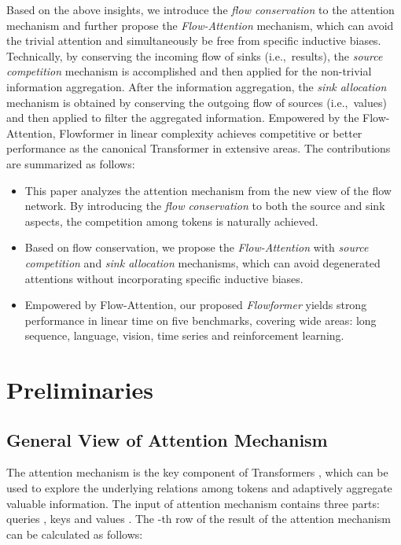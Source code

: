 \documentclass[nohyperref]{article}
\theoremstyle{plain}
\theoremstyle{definition}
\theoremstyle{remark}
\begin{document}
Based on the above insights, we introduce the \emph{flow conservation} to the attention mechanism and further propose the \emph{Flow-Attention} mechanism, which can avoid the trivial attention and simultaneously be free from specific inductive biases. Technically, by conserving the incoming flow of sinks (i.e.,~results), the \emph{source competition} mechanism is accomplished and then applied for the non-trivial information aggregation. After the information aggregation, the \emph{sink allocation} mechanism is obtained by conserving the outgoing flow of sources (i.e.,~values) and then applied to filter the aggregated information. Empowered by the Flow-Attention, Flowformer in linear complexity achieves competitive or better performance as the canonical Transformer in extensive areas.
The contributions are summarized as follows:
\begin{itemize}
    \vspace{-5pt}
  \item This paper analyzes the attention mechanism from the new view of the flow network. By introducing the \emph{flow conservation} to both the source and sink aspects, the competition among tokens is naturally achieved.
  \vspace{-3pt}
  \item Based on flow conservation, we propose the \emph{Flow-Attention} with \emph{source competition} and \emph{sink allocation} mechanisms, which can avoid degenerated attentions without incorporating specific inductive biases.
  \vspace{-3pt}
  \item Empowered by Flow-Attention, our proposed \emph{Flowformer} yields strong performance in linear time on five benchmarks, covering wide areas: long sequence, language, vision, time series and reinforcement learning.
\end{itemize}


\section{Preliminaries}
\vspace{-3pt}
\subsection{General View of Attention Mechanism}
\vspace{-3pt}

The attention mechanism is the key component of Transformers \citep{NIPS2017_3f5ee243}, which can be used to explore the underlying relations among tokens and adaptively aggregate valuable information. The input of attention mechanism contains three parts: queries , keys  and values . The -th row of the result   of the attention mechanism can be calculated as follows:
\end{document}

